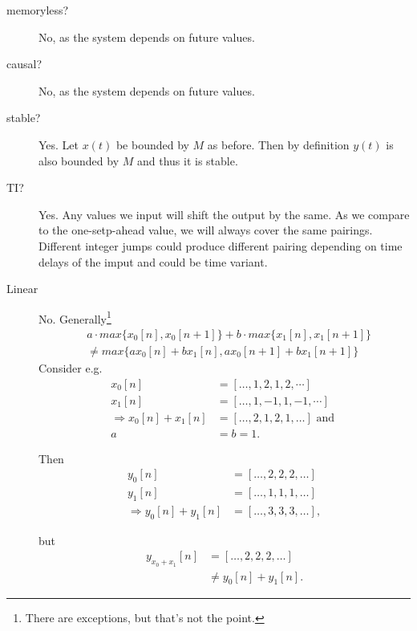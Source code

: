 \begin{description}
    \item[memoryless?] No, as the system depends on future values.
    \item[causal?] No, as the system depends on future values.
    \item[stable?] Yes. Let $x(t)$ be bounded by $M$ as before. Then by definition 
    $y(t)$ is also bounded by $M$ and thus it is stable.
    \item[TI?] Yes. Any values we input will shift the output by the same. As 
    we compare to the one-setp-ahead value, we will always cover the same pairings. Different integer jumps could produce different pairing depending on time 
    delays of the imput and could be time variant.
    \item[Linear] No. Generally\footnote{There are exceptions, but that's not
    the point.}
    \begin{align}
        &a\cdot max\{x_0[n], x_0[n+1]\} + b\cdot max\{x_1[n],
        x_1[n+1]\}\nonumber\\
        &\neq max\{ax_0[n] + bx_1[n], ax_0[n+1] + bx_1[n+1]\}
    \end{align}
Consider e.g.
\begin{align}
    x_0[n] &= [\dots, 1, 2, 1, 2, \cdots]\\
    x_1[n] &= [\dots, 1, -1, 1, -1, \cdots]\\ 
\Rightarrow x_0[n]+x_1[n] &= [\dots, 2, 1, 2, 1, \dots]\text{ and }\\
    a&=b=1.
\end{align}

Then 
\begin{align}
    y_0[n] &= [\dots, 2, 2, 2, \dots]\\
    y_1[n] &= [\dots, 1, 1, 1, \dots]\\
\Rightarrow y_0[n]+y_1[n] &= [\dots, 3, 3, 3, \dots],
\end{align}

but
\begin{align}
    y_{x_0 + x_1}[n] &= [\dots, 2, 2, 2, \dots]\\
    &\neq y_0[n]+y_1[n].
\end{align}
\end{description}

